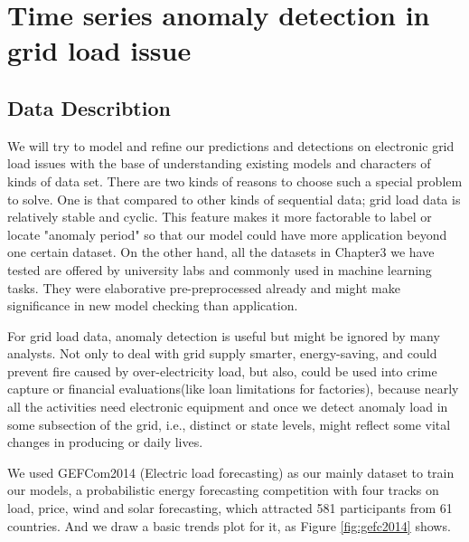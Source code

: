 
\chapter{Time series anomaly detection in grid load issue} %

\label{Chapter4} %


\section{Data Describtion}
We will try to model and refine our predictions and detections on electronic grid load issues with the base of understanding existing models and characters of kinds of data set. There are two kinds of reasons to choose such a special problem to solve. One is that compared to other kinds of sequential data; grid load data is relatively stable and cyclic. This feature makes it more factorable to label or locate "anomaly period" so that our model could have more application beyond one certain dataset. On the other hand, all the datasets in Chapter3 we have tested are offered by university labs and commonly used in machine learning tasks. They were elaborative pre-preprocessed already and might make significance in new model checking than application. 

For grid load data, anomaly detection is useful but might be ignored by many analysts. Not only to deal with grid supply smarter, energy-saving, and could prevent fire caused by over-electricity load, but also, could be used into crime capture or financial evaluations(like loan limitations for factories), because nearly all the activities need electronic equipment and once we detect anomaly load in some subsection of the grid, i.e., distinct or state levels, might reflect some vital changes in producing or daily lives. 

We used GEFCom2014 (Electric load forecasting) as our mainly dataset to train our models, a probabilistic energy forecasting competition with four tracks on load, price, wind and solar forecasting, which attracted 581 participants from 61 countries. And we draw a basic trends plot for it, as Figure \ref{fig:gefc2014} shows.


